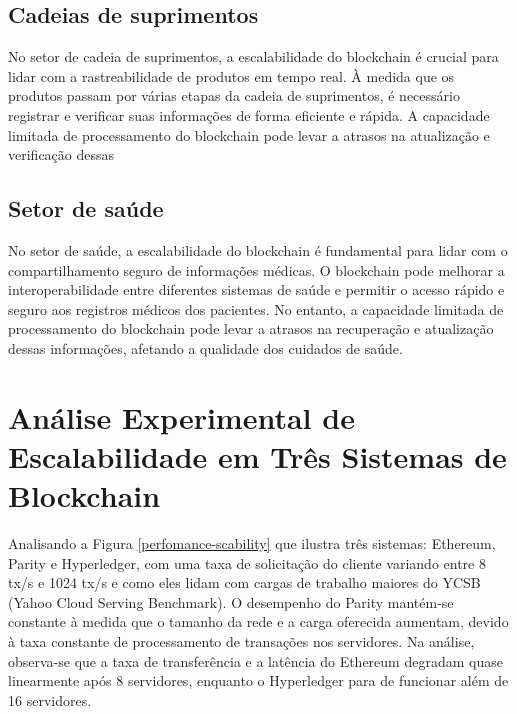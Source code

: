 \subsection{Cadeias de suprimentos}

 No setor de cadeia de suprimentos, a escalabilidade do blockchain é crucial para lidar com a rastreabilidade de produtos em tempo real. À medida que os produtos passam por várias etapas da cadeia de suprimentos, é necessário registrar e verificar suas informações de forma eficiente e rápida. A capacidade limitada de processamento do blockchain pode levar a atrasos na atualização e verificação dessas 

 
\subsection{Setor de saúde}

No setor de saúde, a escalabilidade do blockchain é fundamental para lidar com o compartilhamento seguro de informações médicas. O blockchain pode melhorar a interoperabilidade entre diferentes sistemas de saúde e permitir o acesso rápido e seguro aos registros médicos dos pacientes. No entanto, a capacidade limitada de processamento do blockchain pode levar a atrasos na recuperação e atualização dessas informações, afetando a qualidade dos cuidados de saúde.

\section{Análise Experimental de Escalabilidade em Três Sistemas de Blockchain }

Analisando a Figura \ref{perfomance-scability} que ilustra três sistemas: Ethereum, Parity e Hyperledger, com uma taxa de solicitação do cliente variando entre 8 tx/s e 1024 tx/s e como eles lidam com cargas de trabalho maiores do YCSB (Yahoo Cloud Serving Benchmark). O desempenho do Parity mantém-se constante à medida que o tamanho da rede e a carga oferecida aumentam, devido à taxa constante de processamento de transações nos servidores. Na análise, observa-se que a taxa de transferência e a latência do Ethereum degradam quase linearmente após 8 servidores, enquanto o Hyperledger para de funcionar além de 16 servidores.

